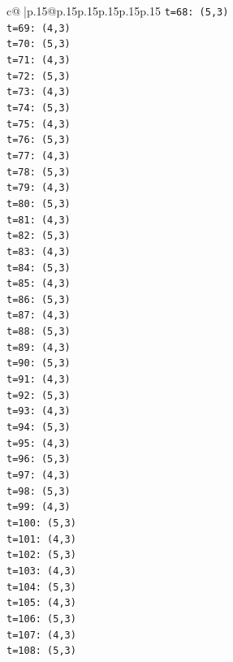\documentclass{article}
\begin{document}
{\begin{supertabular}{c@{$\;$}|p{.15\linewidth}@{}p{.15\linewidth}p{.15\linewidth}p{.15\linewidth}p{.15\linewidth}p{.15\linewidth}}
{{{\texttt{t=68: (5,3)} \\
\texttt{t=69: (4,3)} \\
\texttt{t=70: (5,3)} \\
\texttt{t=71: (4,3)} \\
\texttt{t=72: (5,3)} \\
\texttt{t=73: (4,3)} \\
\texttt{t=74: (5,3)} \\
\texttt{t=75: (4,3)} \\
\texttt{t=76: (5,3)} \\
\texttt{t=77: (4,3)} \\
\texttt{t=78: (5,3)} \\
\texttt{t=79: (4,3)} \\
\texttt{t=80: (5,3)} \\
\texttt{t=81: (4,3)} \\
\texttt{t=82: (5,3)} \\
\texttt{t=83: (4,3)} \\
\texttt{t=84: (5,3)} \\
\texttt{t=85: (4,3)} \\
\texttt{t=86: (5,3)} \\
\texttt{t=87: (4,3)} \\
\texttt{t=88: (5,3)} \\
\texttt{t=89: (4,3)} \\
\texttt{t=90: (5,3)} \\
\texttt{t=91: (4,3)} \\
\texttt{t=92: (5,3)} \\
\texttt{t=93: (4,3)} \\
\texttt{t=94: (5,3)} \\
\texttt{t=95: (4,3)} \\
\texttt{t=96: (5,3)} \\
\texttt{t=97: (4,3)} \\
\texttt{t=98: (5,3)} \\
\texttt{t=99: (4,3)} \\
\texttt{t=100: (5,3)} \\
\texttt{t=101: (4,3)} \\
\texttt{t=102: (5,3)} \\
\texttt{t=103: (4,3)} \\
\texttt{t=104: (5,3)} \\
\texttt{t=105: (4,3)} \\
\texttt{t=106: (5,3)} \\
\texttt{t=107: (4,3)} \\
\texttt{t=108: (5,3)} \\
}}}
\end{supertabular}}
\end{document}
